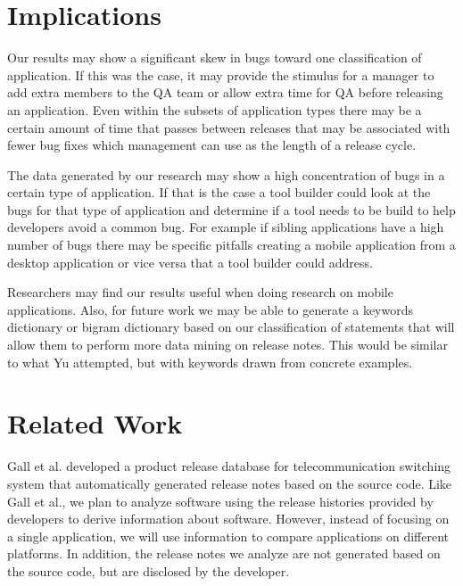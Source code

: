 \documentclass{acm_proc_article-sp}
\begin{document}
\section{Implications}
 Our results may show a significant skew in bugs toward one classification of application. If this was the case, it may provide the stimulus for a manager to add extra members to the QA team or allow extra time for QA before releasing an application. 
Even within the subsets of application types there may be a certain amount of time that passes between releases that may be associated with fewer bug fixes which management can use as the length of a release cycle.

 The data generated by our research may show a high concentration of bugs in a certain type of application. 
If that is the case a tool builder could look at the bugs for that type of application and determine if a tool needs to be build to help developers avoid a common bug. 
For example if sibling applications have a high number of bugs there may be specific pitfalls creating a mobile application from a desktop application or vice versa that a tool builder could address.

 Researchers may find our results useful when doing research on mobile applications.
Also, for future work we may be able to generate a keywords dictionary or bigram dictionary based on our classification of statements that will allow them to perform more data mining on release notes.
This would be similar to what Yu \cite{YuChangeLogs} attempted, but with keywords drawn from concrete examples.


\section{Related Work}

Gall et al. \cite{GallSoftwareEv} developed a product release database for telecommunication switching system that automatically generated release notes based on the source code.
Like Gall et al., we plan to analyze software using the release histories provided by developers to derive information about software. 
However, instead of focusing on a single application, we will use information to compare applications on different platforms. 
In addition, the release notes we analyze are not generated based on the source code, but are disclosed by the developer.
\end{document}

